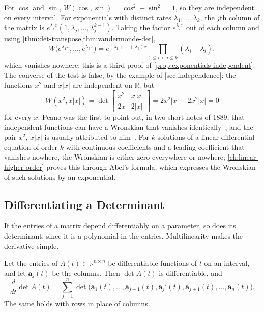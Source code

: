 For $\cos$ and $\sin$, $W(\cos,\sin)=\cos^2+\sin^2=1$, so they are independent on every interval. For exponentials with distinct rates $\lambda_1,\ldots,\lambda_k$, the $j$th column of the matrix is $e^{\lambda_jx}(1,\lambda_j,\ldots,\lambda_j^{k-1})$. Taking the factor $e^{\lambda_jx}$ out of each column and using \cref{thm:det-transpose,thm:vandermonde-det},
\[
W\bigl(e^{\lambda_1x},\ldots,e^{\lambda_kx}\bigr)=e^{(\lambda_1+\cdots+\lambda_k)x}\prod_{1\le i<j\le k}(\lambda_j-\lambda_i),
\]
which vanishes nowhere; this is a third proof of \cref{prop:exponentials-independent}. The converse of the test is false, by the example of \cref{sec:independence}: the functions $x^2$ and $x|x|$ are independent on $\mathbb R$, but
\[
W(x^2,x|x|)=\det\begin{bmatrix}x^2&x|x|\\2x&2|x|\end{bmatrix}=2x^2|x|-2x^2|x|=0
\]
for every $x$. Peano was the first to point out, in two short notes of 1889, that independent functions can have a Wronskian that vanishes identically~\cite{peano1889wronskien,peano1889wronskiens}, and the pair $x^2$, $x|x|$ is usually attributed to him~\cite{bostan2010}. For $k$ solutions of a linear differential equation of order $k$ with continuous coefficients and a leading coefficient that vanishes nowhere, the Wronskian is either zero everywhere or nowhere; \cref{ch:linear-higher-order} proves this through Abel's formula, which expresses the Wronskian of such solutions by an exponential.

\subsection{Differentiating a Determinant}

If the entries of a matrix depend differentiably on a parameter, so does its determinant, since it is a polynomial in the entries. Multilinearity makes the derivative simple.

\begin{proposition}
\label{prop:det-derivative}
Let the entries of $A(t)\in\mathbb R^{n\times n}$ be differentiable functions of $t$ on an interval, and let $\mathbf a_j(t)$ be the columns. Then $\det A(t)$ is differentiable, and
\[
\frac{d}{dt}\det A(t)=\sum_{j=1}^n\det\bigl(\mathbf a_1(t),\ldots,\mathbf a_{j-1}(t),\mathbf a_j'(t),\mathbf a_{j+1}(t),\ldots,\mathbf a_n(t)\bigr).
\]
The same holds with rows in place of columns.
\end{proposition}

